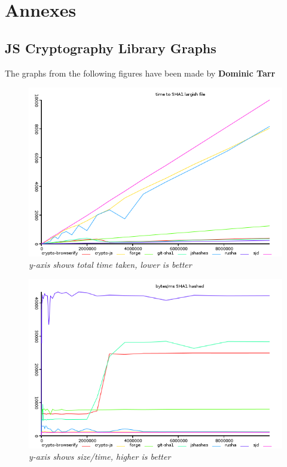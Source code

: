 \graphicspath{{./annexes/}} %

\section{Annexes}

\subsection{JS Cryptography Library Graphs}
The graphs from the following figures have been made by \textbf{Dominic Tarr} \cite {Tarr2014PerformanceLibraries.}

\begin{figure}
\centering
\includegraphics[scale=0.6]{graphs/hash-sha1.png}
\caption{\small \sl y-axis shows total time taken, lower is better
\label{fig:hash-sha1}}  
\end{figure}

\begin{figure}
\centering
\includegraphics[scale=0.6]{graphs/hash-ops-sha1.png}
\caption{\small \sl y-axis shows size/time, higher is better
\label{fig:hash-ops-sha1}}
\end{figure}

